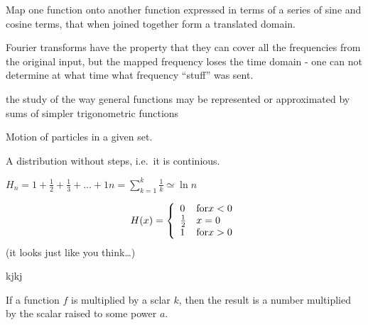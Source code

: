 \begin{definition}
    Map one function onto another function expressed in terms of a 
    series of sine and cosine terms, that when joined together form
    a translated domain.

    Fourier transforms have the property that they can cover all the frequencies
    from the original input, but the mapped frequency loses the time domain -
    one can not determine at what time what frequency ``stuff''  was sent.

\end{definition}

\begin{definition}
    the study of the way general functions may be represented or approximated
    by sums of simpler trigonometric functions

\end{definition}

\begin{definition}[Flow]
    Motion of particles in a given set.
\end{definition}

\begin{definition}
   A distribution without steps, i.e.\ it is continious. 
\end{definition}

\begin{definition}
    $H_{n} = 1 + \frac{1}{2} + \frac{1}{3} + \dots + {1}{n} =
    {\sum\limits_{k = 1}^{k}} \frac{1}{k} \simeq \ln n$
\end{definition}

\begin{definition}
    $$
    H(x) = \left\{
            \begin{array}{l l}
                0 & \text{for} x < 0 \\
                \frac{1}{2} & x = 0 \\
                1 & \text{for} x > 0 \\
            \end{array}
        \right.
    $$
    (it looks just like you think\dots)
\end{definition}

\begin{definition}
    kjkj
\end{definition}

\begin{definition}[Homogenous]
    If a function $f$ is multiplied by a sclar $k$, then the result
    is a number multiplied by the scalar raised to some power $a$.
\end{definition}

